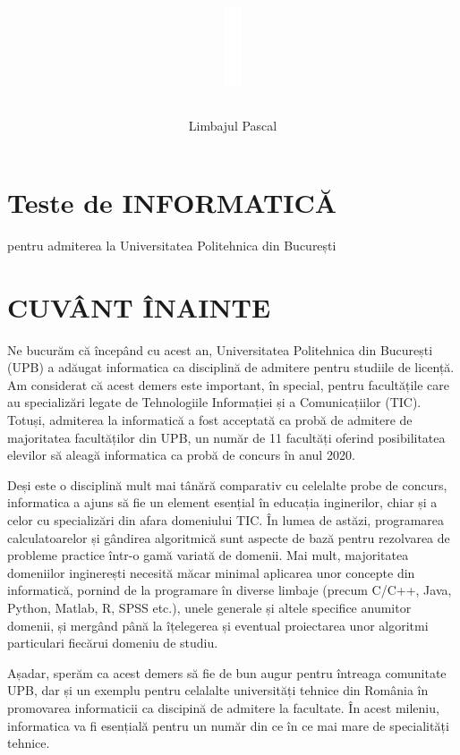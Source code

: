 \documentclass[10pt]{article}
\title{\begin{center}
\includegraphics[max width=\textwidth]{2025_04_17_46e04c6acd873ea9558dg-021(2)}
\end{center}}
\author{Limbajul Pascal}
\date{}
\begin{document}
\maketitle
\section*{Teste de INFORMATICĂ}
pentru admiterea la Universitatea Politehnica din București

\section*{CUVÂNT ÎNAINTE}
Ne bucurăm că începând cu acest an, Universitatea Politehnica din București (UPB) a adăugat informatica ca disciplină de admitere pentru studiile de licență. Am considerat că acest demers este important, în special, pentru facultățile care au specializări legate de Tehnologiile Informației și a Comunicațiilor (TIC). Totuși, admiterea la informatică a fost acceptată ca probă de admitere de majoritatea facultăților din UPB, un număr de 11 facultăți oferind posibilitatea elevilor să aleagă informatica ca probă de concurs în anul 2020.

Deși este o disciplină mult mai tânără comparativ cu celelalte probe de concurs, informatica a ajuns să fie un element esențial în educația inginerilor, chiar și a celor cu specializări din afara domeniului TIC. În lumea de astăzi, programarea calculatoarelor și gândirea algoritmică sunt aspecte de bază pentru rezolvarea de probleme practice într-o gamă variată de domenii. Mai mult, majoritatea domeniilor inginerești necesită măcar minimal aplicarea unor concepte din informatică, pornind de la programare în diverse limbaje (precum C/C++, Java, Python, Matlab, R, SPSS etc.), unele generale și altele specifice anumitor domenii, și mergând până la îțelegerea și eventual proiectarea unor algoritmi particulari fiecărui domeniu de studiu.

Așadar, sperăm ca acest demers să fie de bun augur pentru întreaga comunitate UPB, dar și un exemplu pentru celalalte universități tehnice din România în promovarea informaticii ca discipină de admitere la facultate. În acest mileniu, informatica va fi esențială pentru un număr din ce în ce mai mare de specialități tehnice.
\end{document}
